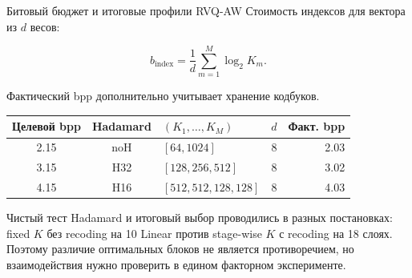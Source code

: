 \documentclass[aspectratio=169,10pt]{beamer}
\begin{document}
%

\begin{frame}[t]{Битовый бюджет и итоговые профили RVQ-AW}
  Стоимость индексов для вектора из $d$ весов:

  \[
    b_{\mathrm{index}}
    =
    \frac{1}{d}
    \sum_{m=1}^{M}\log_2 K_m.
  \]

  {\small
    Фактический bpp дополнительно
    учитывает хранение кодбуков.
  }

  \vspace{2mm}

  \begin{center}
    \small
    \renewcommand{\arraystretch}{1.3}
    \setlength{\tabcolsep}{3mm}

    \begin{tabular}{cclcr}
      \toprule

      \textbf{Целевой bpp}
        & \textbf{Hadamard}
        & \boldmath$(K_1,\ldots,K_M)$
        & \boldmath$d$
        & \textbf{Факт. bpp} \\

      \midrule

      2.15
        & noH
        & $[64,1024]$
        & 8
        & 2.03 \\

      3.15
        & H32
        & $[128,256,512]$
        & 8
        & 3.02 \\

      4.15
        & H16
        & $[512,512,128,128]$
        & 8
        & 4.03 \\

      \bottomrule
    \end{tabular}
  \end{center}

  \vspace{2mm}

  {\small\color{Muted}
    Чистый тест Hadamard и итоговый выбор проводились
    в разных постановках: fixed $K$ без recoding на 10 Linear
    против stage-wise $K$ с recoding на 18 слоях.
    Поэтому различие оптимальных блоков не является противоречием,
    но взаимодействия нужно проверить в едином факторном эксперименте.
  }
\end{frame}
\end{document}
